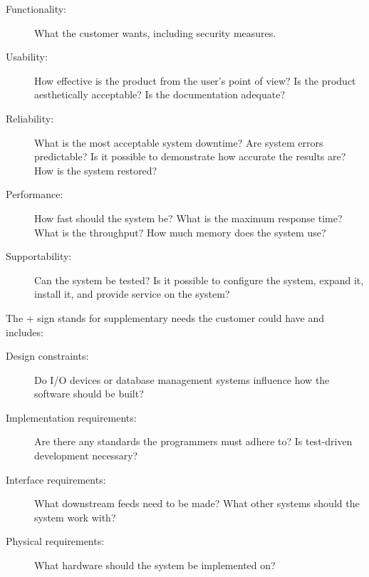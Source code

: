 \begin{description}
    \item [Functionality:] What the customer wants, including security measures.

    \item [Usability:] How effective is the product from the user's point of
    view? Is the product aesthetically acceptable? Is the documentation adequate?

    \item [Reliability:] What is the most acceptable system downtime? Are system
    errors predictable? Is it possible to demonstrate how accurate the results
    are? How is the system restored?

    \item [Performance:] How fast should the system be? What is the maximum
    response time? What is the throughput? How much memory does the system use?

    \item [Supportability:] Can the system be tested? Is it possible to
    configure the system, expand it, install it, and provide service on the
    system?
\end{description}

The + sign stands for supplementary needs the customer could have and includes:

\begin{description}
    \item [Design constraints:] Do I/O devices or database management systems
    influence how the software should be built?

    \item [Implementation requirements:] Are there any standards the programmers
    must adhere to? Is test-driven development necessary?

    \item [Interface requirements:] What downstream feeds need to be made? What
    other systems should the system work with?

    \item [Physical requirements:] What hardware should the system be
    implemented on?
\end{description}
